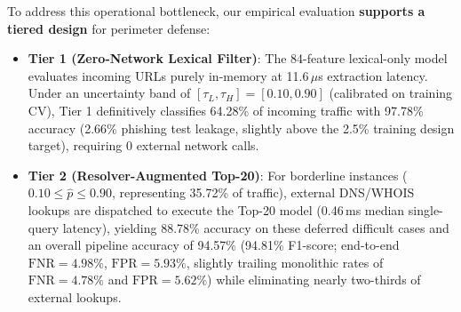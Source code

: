 To address this operational bottleneck, our empirical evaluation \textbf{supports a tiered design} for perimeter defense:
\begin{itemize}
    \item \textbf{Tier 1 (Zero-Network Lexical Filter)}: The 84-feature lexical-only model evaluates incoming URLs purely in-memory at 11.6\,$\mu$s extraction latency. Under an uncertainty band of $[\tau_L, \tau_H] = [0.10, 0.90]$ (calibrated on training CV), Tier 1 definitively classifies 64.28\% of incoming traffic with 97.78\% accuracy (2.66\% phishing test leakage, slightly above the 2.5\% training design target), requiring 0 external network calls.
    \item \textbf{Tier 2 (Resolver-Augmented Top-20)}: For borderline instances ($0.10 \le \hat{p} \le 0.90$, representing 35.72\% of traffic), external DNS/WHOIS lookups are dispatched to execute the Top-20 model (0.46\,ms median single-query latency), yielding 88.78\% accuracy on these deferred difficult cases and an overall pipeline accuracy of 94.57\% (94.81\% F1-score; end-to-end $\text{FNR}=4.98\%$, $\text{FPR}=5.93\%$, slightly trailing monolithic rates of $\text{FNR}=4.78\%$ and $\text{FPR}=5.62\%$) while eliminating nearly two-thirds of external lookups.
\end{itemize}

